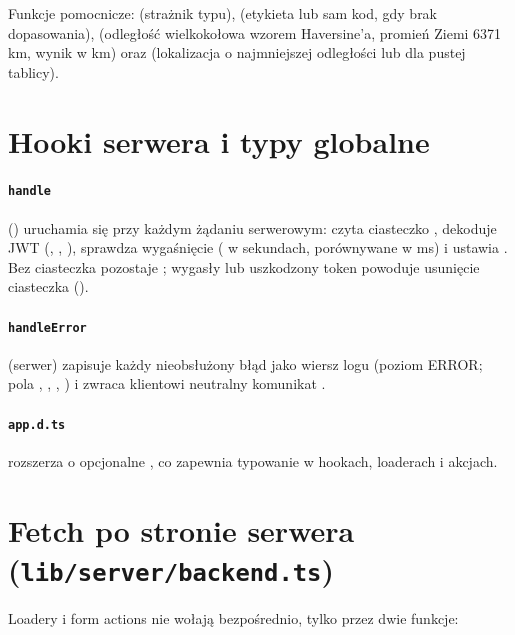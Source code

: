 Funkcje pomocnicze:  (strażnik typu), 
(etykieta lub sam kod, gdy brak dopasowania),  (odległość wielkokołowa wzorem
Haversine'a, promień Ziemi 6371 km, wynik w km) oraz 
(lokalizacja o najmniejszej odległości lub  dla pustej tablicy).

\section{Hooki serwera i typy globalne}\label{sec:fe-hooks}

\paragraph{\texttt{handle}} () uruchamia się przy każdym żądaniu serwerowym:
czyta ciasteczko , dekoduje JWT (, , ), sprawdza
wygaśnięcie ( w sekundach, porównywane w ms) i ustawia
. Bez ciasteczka
 pozostaje ; wygasły lub uszkodzony token powoduje usunięcie
ciasteczka ().

\paragraph{\texttt{handleError}} (serwer) zapisuje każdy nieobsłużony błąd jako wiersz logu
 (poziom ERROR; pola , , , )
i zwraca klientowi neutralny komunikat .

\paragraph{\texttt{app.d.ts}} rozszerza  o opcjonalne
, co zapewnia typowanie 
w hookach, loaderach i akcjach.

\section{Fetch po stronie serwera (\texttt{lib/server/backend.ts})}\label{sec:fe-backend}

Loadery i form actions nie wołają  bezpośrednio, tylko przez dwie funkcje:

